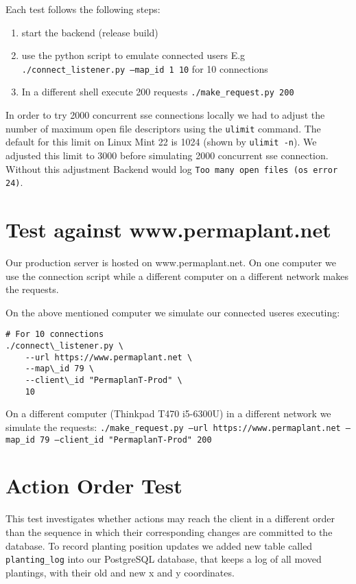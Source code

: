 \documentclass[final,draft]{vutinfth} %
\begin{document}
Each test follows the following steps:
\begin{enumerate}
    \item start the backend (release build)
    \item use the python script to emulate connected users
    E.g \texttt{./connect\_listener.py --map\_id 1 10} for 10 connections
    \item In a different shell execute 200 requests \texttt{./make\_request.py 200}
\end{enumerate}

In order to try 2000 concurrent \gls{sse} connections locally we had to adjust the number of maximum open file descriptors using the \texttt{ulimit} command.
The default for this limit on Linux Mint 22 is 1024 (shown by \texttt{ulimit -n}).
We adjusted this limit to 3000 before simulating 2000 concurrent \gls{sse} connection.
Without this adjustment Backend would log \texttt{Too many open files (os error 24)}.

\section{Test against www.permaplant.net}

Our production server is hosted on www.permaplant.net.
On one computer we use the connection script while a different computer on a different network makes the requests.

On the above mentioned computer we simulate our connected useres executing: 
\begin{verbatim}
# For 10 connections
./connect\_listener.py \
    --url https://www.permaplant.net \
    --map\_id 79 \
    --client\_id "PermaplanT-Prod" \
    10 
\end{verbatim}

On a different computer (Thinkpad T470 i5-6300U) in a different network we simulate the requests:
\texttt{./make\_request.py --url https://www.permaplant.net --map\_id 79 --client\_id "PermaplanT-Prod" 200}

\section{Action Order Test}

This test investigates whether actions may reach the client in a different order than the sequence in which their corresponding changes are committed to the database.
To record planting position updates we added new table called \texttt{planting\_log} into our PostgreSQL database, that keeps a log of all moved plantings, with their old and new x and y coordinates.
\end{document}
